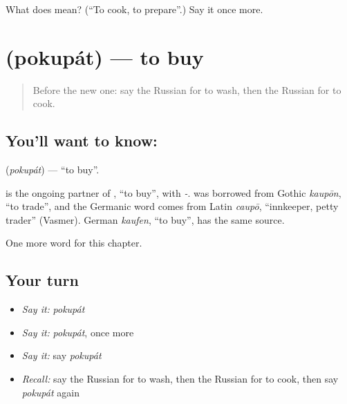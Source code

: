 \begin{tcolorbox}[breakable,colback=teal!4,colframe=teal!35!black,title={Before you move on}]
What does  mean? (\textquotedblleft{}To cook, to prepare\textquotedblright{}.) Say it once more.
\end{tcolorbox}
\section[\texorpdfstring{\ru{покупать} (pokupát)}{покупать (pokupát)}]{ (pokupát) — to buy}

\label{lesson:RU-C39-pokupat}



\begin{quote}
Before the new one: say the Russian for to wash, then the Russian for to cook.
\end{quote}

\subsection*{You'll want to know: }
\textbf{} (\emph{pokupát}) — \textquotedblleft{}to buy\textquotedblright{}.

\begin{cousinweb}
\textbf{} is the ongoing partner of \emph{}, \textquotedblleft{}to buy\textquotedblright{}, with \emph{-}. \emph{} was borrowed from Gothic \emph{kaupōn}, \textquotedblleft{}to trade\textquotedblright{}, and the Germanic word comes from Latin \emph{caupō}, \textquotedblleft{}innkeeper, petty trader\textquotedblright{} (Vasmer). German \emph{kaufen}, \textquotedblleft{}to buy\textquotedblright{}, has the same source.
\end{cousinweb}

\begin{grammarlens}[title={What you've built}]
One more word for this chapter.
\end{grammarlens}

\subsection*{Your turn}
\begin{itemize}
\raggedright
  \item \emph{Say it:} \emph{pokupát}
  \item \emph{Say it:} \emph{pokupát}, once more
  \item \emph{Say it:} say \emph{pokupát}
  \item \emph{Recall:} say the Russian for to wash, then the Russian for to cook, then say \emph{pokupát} again
\end{itemize}


